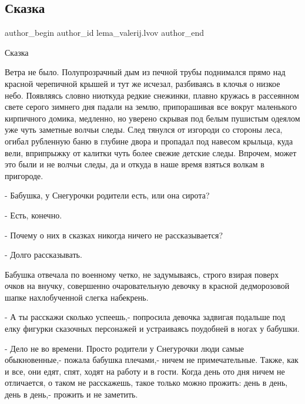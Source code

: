 
 
 
 
 
 
\subsection{Сказка}
\label{sec:14_12_2017.fb.lema_valerij.lvov.1.skazka}
 
\ifcmt
 author_begin
   author_id lema_valerij.lvov
 author_end
\fi

Сказка 

Ветра не было. Полупрозрачный дым из печной трубы поднимался прямо над красной
черепичной крышей и тут же исчезал, разбиваясь в клочья о низкое небо.
Появляясь словно ниоткуда редкие снежинки, плавно кружась в рассеянном свете
серого зимнего дня падали на землю, припорашивая все вокруг маленького
кирпичного домика, медленно, но уверено скрывая под белым пушистым одеялом уже
чуть заметные волчьи следы. След тянулся от изгороди со стороны леса, огибал
рубленную баню в глубине двора и пропадал под навесом крыльца, куда вели,
вприпрыжку от калитки чуть более свежие детские следы. Впрочем, может это были
и не волчьи следы, да и откуда в наше время взяться волкам в пригороде.

- Бабушка, у Снегурочки родители есть, или она сирота?

- Есть, конечно.

- Почему о них в сказках никогда ничего не рассказывается?

- Долго рассказывать.

Бабушка отвечала по военному четко, не задумываясь, строго взирая поверх
очков на внучку, совершенно очаровательную девочку в красной дедморозовой
шапке нахлобученной слегка набекрень.

- А ты расскажи сколько успеешь,- попросила девочка задвигая подальше под елку
фигурки сказочных персонажей и устраиваясь поудобней в ногах у бабушки.

- Дело не во времени. Просто родители у Снегурочки люди самые обыкновенные,-
пожала бабушка плечами,- ничем не примечательные. Также, как и все, они едят,
спят, ходят на работу и в гости. Когда день ото дня ничем не отличается, о
таком не расскажешь, такое только можно прожить: день в день, день в день,-
прожить и не заметить.

